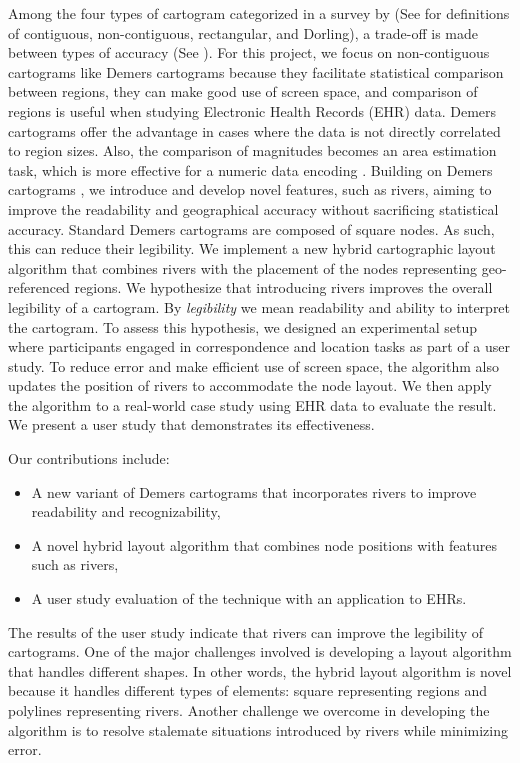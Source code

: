\documentclass[Afour,sagev,times]{sagej}
\begin{document}
Among the four types of cartogram categorized in a survey by \citet{nusrat2016State} (See  for definitions of contiguous, non-contiguous, rectangular, and Dorling), a trade-off is made between types of accuracy (See ).
For this project, we focus on non-contiguous cartograms like Demers cartograms because they facilitate statistical comparison between regions, they can make good use of screen space, and comparison of regions is useful when studying Electronic Health Records (EHR) data.
Demers cartograms offer the advantage in cases where the data is not directly correlated to region sizes. Also, the comparison of magnitudes becomes an area estimation task, which is more effective for a numeric data encoding \cite{munzner2014Visualization}.
Building on Demers cartograms \cite{ian2002Cartogram}, we introduce and develop novel features, such as rivers, aiming to improve the readability and geographical accuracy without sacrificing statistical accuracy.
Standard Demers cartograms are composed of square nodes. As such, this can reduce their legibility.
We implement a new hybrid cartographic layout algorithm that combines rivers with the placement of the nodes representing geo-referenced regions.
We hypothesize that introducing rivers improves the overall legibility of a cartogram.
By \textit{legibility} we mean readability and ability to interpret the cartogram.
To assess this hypothesis, we designed an experimental setup where participants engaged in correspondence and location tasks as part of a user study.
To reduce error and make efficient use of screen space, the algorithm also updates the position of rivers to accommodate the node layout.
We then apply the algorithm to a real-world case study using EHR data to evaluate the result.
We present a user study that demonstrates its effectiveness.

Our contributions include:

\begin{itemize}
    \setlength\itemsep{0px}
    \item A new variant of Demers cartograms that incorporates rivers to improve readability and recognizability,
    \item A novel hybrid layout algorithm that combines node positions with features such as rivers,
    \item A user study evaluation of the technique with an application to EHRs.
\end{itemize}

The results of the user study indicate that rivers can improve the legibility of cartograms.
One of the major challenges involved is developing a layout algorithm that handles different shapes.
In other words, the hybrid layout algorithm is novel because it handles different types of elements: square representing regions and polylines representing rivers.
Another challenge we overcome in developing the algorithm is to resolve stalemate situations introduced by rivers while minimizing error.
\end{document}
